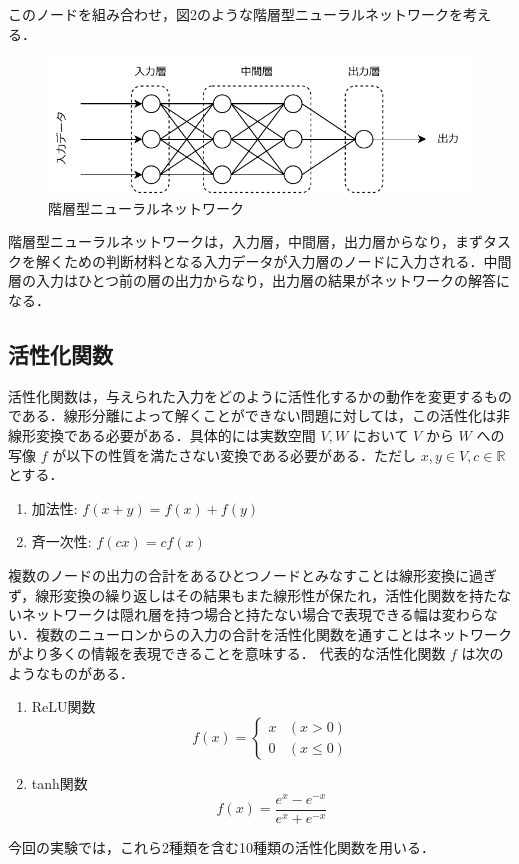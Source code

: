 このノードを組み合わせ，図2のような階層型ニューラルネットワークを考える．

\begin{figure}[h]
    \begin{center}
        \includegraphics[scale=0.8]{img/forwardprop.pdf}
        \caption{階層型ニューラルネットワーク}
    \end{center}
\end{figure}

階層型ニューラルネットワークは，入力層，中間層，出力層からなり，まずタスクを解くための判断材料となる入力データが入力層のノードに入力される．中間層の入力はひとつ前の層の出力からなり，出力層の結果がネットワークの解答になる．

\clearpage
\subsection{活性化関数}
活性化関数は，与えられた入力をどのように活性化するかの動作を変更するものである．線形分離によって解くことができない問題に対しては，この活性化は非線形変換である必要がある\cite{活性化関数}．具体的には実数空間 $ V, W $ において  $ V $ から $ W $ への写像 $ f $ が以下の性質を満たさない変換である必要がある．ただし $ x, y \in V, c \in \mathbb{R} $ とする．

\begin{enumerate}
    \item 加法性: $ f(x + y) = f(x) + f(y) $ 
    \item 斉一次性: $ f(cx) = cf(x) $
\end{enumerate}

複数のノードの出力の合計をあるひとつノードとみなすことは線形変換に過ぎず，線形変換の繰り返しはその結果もまた線形性が保たれ，活性化関数を持たないネットワークは隠れ層を持つ場合と持たない場合で表現できる幅は変わらない．複数のニューロンからの入力の合計を活性化関数を通すことはネットワークがより多くの情報を表現できることを意味する．
代表的な活性化関数 $ f $ は次のようなものがある．

\begin{enumerate}
    \item ReLU関数
    \begin{equation}
        f(x) = 
        \begin{cases}
        x & (x > 0)\\
        0 & (x \leq 0)
        \end{cases}
    \end{equation}

    \item tanh関数
    \begin{equation}
        f(x) = \frac{e^{x} - e^{-x}}{e^{x} + e^{-x}}
    \end{equation}
\end{enumerate}

今回の実験では，これら2種類を含む10種類の活性化関数を用いる．